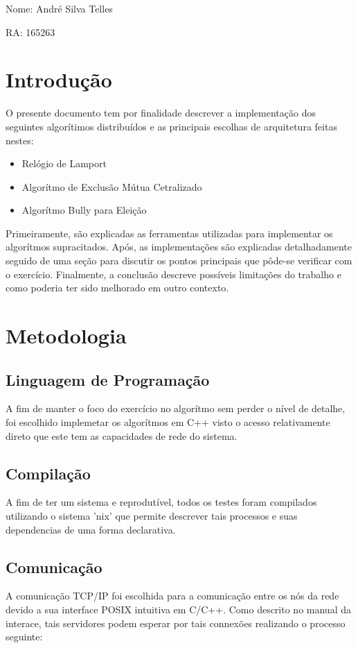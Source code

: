 \documentclass{article}
\begin{document}
Nome: André Silva Telles

RA: 165263

\section{Introdução}
O presente documento tem por finalidade descrever a implementação dos seguintes
algorítimos distribuídos e as principais escolhas de arquitetura feitas nestes:

\begin{itemize}
  \item Relógio de Lamport 
  \item Algorítmo de Exclusão Mútua Cetralizado
  \item Algorítmo Bully para Eleição
\end{itemize}

Primeiramente, são explicadas as ferramentas utilizadas para implementar os
algorítmos supracitados. Após, as implementações são explicadas detalhadamente
seguido de uma seção para discutir os pontos principais que pôde-se verificar
com o exercício. Finalmente, a conclusão descreve possíveis limitações do
trabalho e como poderia ter sido melhorado em outro contexto. 

\section{Metodologia}
\subsection{Linguagem de Programação}
A fim de manter o foco do exercício no algorítmo sem perder o nível de detalhe,
foi escolhido implemetar os algorítmos em C++ visto o acesso relativamente
direto que este tem as capacidades de rede do sistema.  

\subsection{Compilação}
A fim de ter um sistema e reprodutível, todos os testes foram compilados
utilizando o sistema 'nix' que permite descrever tais processos e suas
dependencias de uma forma declarativa.

\subsection{Comunicação}
A comunicação TCP/IP foi escolhida para a comunicação entre os nós da rede
devido a sua interface POSIX intuitiva em C/C++. Como descrito no manual da
interace, tais servidores podem esperar por tais connexões realizando o processo
seguinte: 
\end{document}
